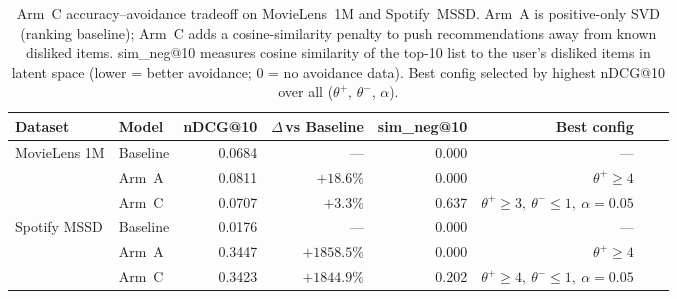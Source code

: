 \begin{table}[ht]
\centering
\caption{Arm~C accuracy--avoidance tradeoff on MovieLens~1M and Spotify~MSSD.
  Arm~A is positive-only SVD (ranking baseline); Arm~C adds a cosine-similarity
  penalty to push recommendations away from known disliked items.
  sim\_neg@10 measures cosine similarity of the top-10 list to the user's
  disliked items in latent space (lower = better avoidance; 0 = no avoidance data).
  Best config selected by highest nDCG@10 over all ($\theta^+$, $\theta^-$, $\alpha$).}
\label{tab:arm_c}
\begin{tabular}{llrrrrrr}
\toprule
Dataset      & Model   & nDCG@10 & $\Delta$\,vs Baseline & sim\_neg@10 & Best config \\
\midrule
MovieLens 1M & Baseline  & 0.0684 & ---      & 0.000 & --- \\
             & Arm~A     & 0.0811 & $+18.6\%$ & 0.000 & $\theta^+\!\geq\!4$ \\
             & Arm~C     & 0.0707 & $+3.3\%$  & 0.637 & $\theta^+\!\geq\!3,\ \theta^-\!\leq\!1,\ \alpha\!=\!0.05$ \\
\midrule
Spotify MSSD & Baseline  & 0.0176 & ---       & 0.000 & --- \\
             & Arm~A     & 0.3447 & $+1858.5\%$ & 0.000 & $\theta^+\!\geq\!4$ \\
             & Arm~C     & 0.3423 & $+1844.9\%$ & 0.202 & $\theta^+\!\geq\!4,\ \theta^-\!\leq\!1,\ \alpha\!=\!0.05$ \\
\bottomrule
\end{tabular}
\end{table}
